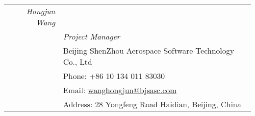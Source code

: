 \documentclass[a4paper,10pt]{article} %
\begin{document}
\begin{tabular}{r|p{11cm}}

\emph{Hongjun Wang}&  \\
& \emph{Project Manager}\\ 
& Beijing ShenZhou Aerospace Software Technology Co., Ltd\\
& Phone: +86 10 134 011 83030\\
& Email: \href{mailto:wanghongjun@bjsasc.com}{wanghongjun@bjsasc.com}\\
& Address: 28 Yongfeng Road Haidian, Beijing, China \\

\end{tabular}
\end{document}
